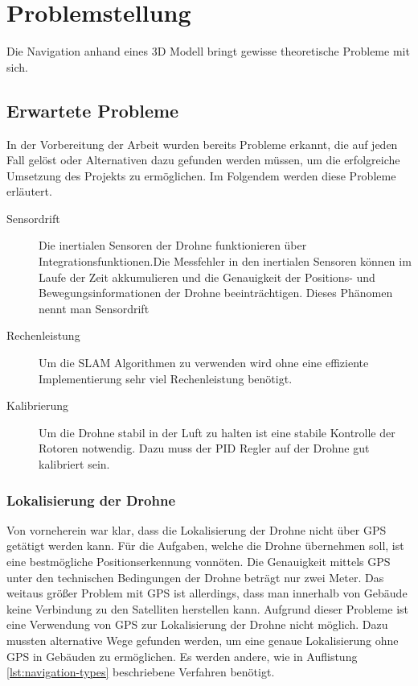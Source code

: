 \chapter{Problemstellung}

Die Navigation anhand eines 3D Modell bringt gewisse theoretische Probleme mit sich.

\section{Erwartete Probleme} \label{erwartete_probleme:section}

In der Vorbereitung der Arbeit wurden bereits Probleme erkannt, die auf jeden Fall gelöst oder Alternativen dazu gefunden werden müssen, um die erfolgreiche Umsetzung des Projekts zu ermöglichen. Im Folgendem werden diese Probleme erläutert.

\begin{description}
    \item[Sensordrift] Die inertialen Sensoren der Drohne funktionieren über Integrationsfunktionen.Die Messfehler in den inertialen Sensoren können im Laufe der Zeit akkumulieren und die Genauigkeit der Positions- und Bewegungsinformationen der Drohne beeinträchtigen. Dieses Phänomen nennt man Sensordrift
    \item[Rechenleistung] Um die \ac{SLAM} Algorithmen zu verwenden wird ohne eine effiziente Implementierung sehr viel Rechenleistung benötigt.
    \item[Kalibrierung] Um die Drohne stabil in der Luft zu halten ist eine stabile Kontrolle der Rotoren notwendig. Dazu muss der \ac{PID} Regler auf der Drohne gut kalibriert sein.
\end{description}

\subsection{Lokalisierung der Drohne} \label{lokalisierung_der_drohne:subsection}

Von vorneherein war klar, dass die Lokalisierung der Drohne nicht über \ac{GPS} getätigt werden kann. Für die Aufgaben, welche die Drohne übernehmen soll, ist eine bestmögliche Positionserkennung vonnöten. Die Genauigkeit mittels \ac{GPS} unter den technischen Bedingungen der Drohne beträgt nur zwei Meter. Das weitaus größer Problem mit \ac{GPS} ist allerdings, dass man innerhalb von Gebäude keine Verbindung zu den Satelliten herstellen kann. Aufgrund dieser Probleme ist eine Verwendung von \ac{GPS} zur Lokalisierung der Drohne nicht möglich. Dazu mussten alternative Wege gefunden werden, um eine genaue Lokalisierung ohne \ac{GPS} in Gebäuden zu ermöglichen. Es werden andere, wie in Auflistung \ref{lst:navigation-types} beschriebene Verfahren benötigt.


